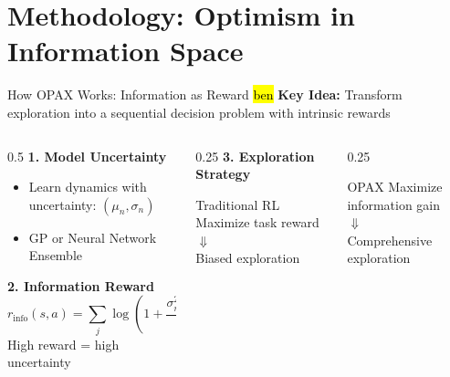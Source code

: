 \documentclass[11pt,aspectratio=169]{beamer}
\begin{document}
\section{Methodology: Optimism in Information Space}

\begin{frame}{How OPAX Works: Information as Reward \hl{ben}}
    \textbf{Key Idea:} Transform exploration into a sequential decision problem with intrinsic rewards
    
    \vspace{0.5em}
    \begin{columns}[T]
        \begin{column}{0.5\textwidth}
            \textbf{1. Model Uncertainty}
            \begin{itemize}
                \item Learn dynamics with uncertainty: $(\mu_n, \sigma_n)$
                \item GP or Neural Network Ensemble
            \end{itemize}
            
            \vspace{0.5em}
            \textbf{2. Information Reward}
            \[ r_{\text{info}}(s,a) = \sum_{j} \log\left(1 + \frac{\sigma_{n,j}^2(s,a)}{\sigma_w^2}\right) \]
            \centering
            \small High reward = high uncertainty
        \end{column}
        \begin{column}{0.25\textwidth}
            \textbf{3. Exploration Strategy}
            \begin{block}{Traditional RL}
                \centering
                Maximize task reward \\
                $\Downarrow$ \\
                Biased exploration \\
            \end{block}
        \end{column}
        \begin{column}{0.25\textwidth}
            \begin{block}{OPAX}
                \centering
                Maximize \alert{information gain} \\
                $\Downarrow$ \\
                Comprehensive exploration
            \end{block}
        \end{column}
    \end{columns}
    

\end{frame}
\end{document}
